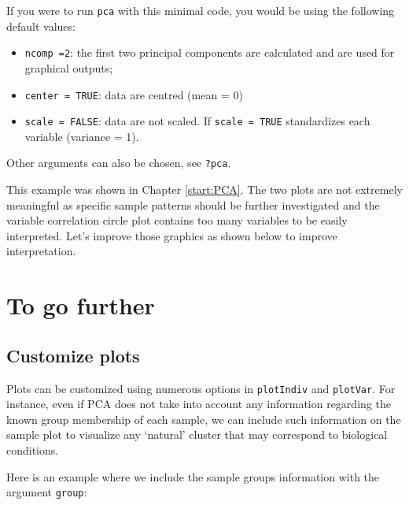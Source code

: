 \documentclass[]{book}
\newenvironment{Shaded}{\begin{snugshade}}{\end{snugshade}}
\newcommand{\DataTypeTok}[1]{\textcolor[rgb]{0.13,0.29,0.53}{#1}}
\newcommand{\KeywordTok}[1]{\textcolor[rgb]{0.13,0.29,0.53}{\textbf{#1}}}
\newcommand{\NormalTok}[1]{#1}
\newcommand{\OperatorTok}[1]{\textcolor[rgb]{0.81,0.36,0.00}{\textbf{#1}}}
\newcommand{\OtherTok}[1]{\textcolor[rgb]{0.56,0.35,0.01}{#1}}
\providecommand{\tightlist}{%
  \setlength{\itemsep}{0pt}\setlength{\parskip}{0pt}}
\begin{document}
If you were to run \texttt{pca} with this minimal code, you would be using the following default values:

\begin{itemize}
\tightlist
\item
  \texttt{ncomp\ =2}: the first two principal components are calculated and are used for graphical outputs;
\item
  \texttt{center\ =\ TRUE}: data are centred (mean = 0)
\item
  \texttt{scale\ =\ FALSE}: data are not scaled. If \texttt{scale\ =\ TRUE} standardizes each variable (variance = 1).
\end{itemize}

Other arguments can also be chosen, see \texttt{?pca}.

This example was shown in Chapter \ref{start:PCA}. The two plots are not extremely meaningful as specific sample patterns should be further investigated and the variable correlation circle plot contains too many variables to be easily interpreted. Let's improve those graphics as shown below to improve interpretation.

\hypertarget{to-go-further}{%
\section{To go further}\label{to-go-further}}

\hypertarget{customize-plots}{%
\subsection{Customize plots}\label{customize-plots}}

Plots can be customized using numerous options in \texttt{plotIndiv} and \texttt{plotVar}. For instance, even if PCA does not take into account any information regarding the known group membership of each sample, we can include such information on the sample plot to visualize any `natural' cluster that may correspond to biological conditions.

Here is an example where we include the sample groups information with the argument \texttt{group}:

\begin{Shaded}
\end{Shaded}
\end{document}

